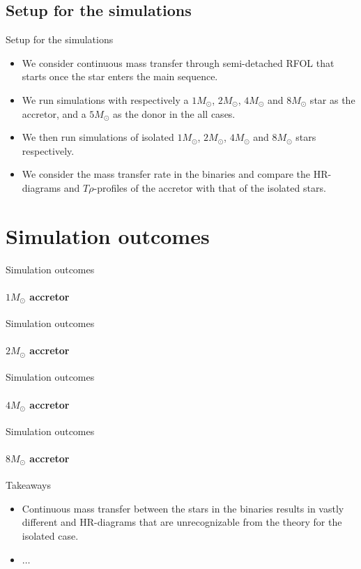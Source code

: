 \documentclass{beamer}
\begin{document}
\subsection{Setup for the simulations}
\begin{frame}{Setup for the simulations}
    \begin{itemize}
        \item<1-> We consider \alert{continuous mass transfer} through semi-detached RFOL that starts once the star enters the main sequence.
        \item<2-> We run simulations with respectively a $1M_\odot$, $2M_\odot$, $4M_\odot$ and $8M_\odot$ star as the \alert{accretor}, and a $5M_\odot$ as the \alert{donor} in the all cases.
        \item<3-> We then run simulations of \alert{isolated} $1M_\odot$, $2M_\odot$, $4M_\odot$ and $8M_\odot$ stars respectively.
        \item<4-> We consider the mass transfer rate in the binaries and compare the HR-diagrams and $T\rho$-profiles of the accretor with that of the isolated stars.
    \end{itemize}
\end{frame}

\section{Simulation outcomes}
\begin{frame}{Simulation outcomes}
\framesubtitle{$1M_\odot$ accretor}
\end{frame}
\begin{frame}{Simulation outcomes}
\framesubtitle{$2M_\odot$ accretor}
\end{frame}
\begin{frame}{Simulation outcomes}
\framesubtitle{$4M_\odot$ accretor}
\end{frame}
\begin{frame}{Simulation outcomes}
\framesubtitle{$8M_\odot$ accretor}
\end{frame}

\begin{frame}{Takeaways}
    \begin{itemize}
        \item Continuous mass transfer between the stars in the binaries results in vastly different and HR-diagrams that are unrecognizable from the theory for the isolated case.
        \item $\dots$
    \end{itemize}
\end{frame}
\end{document}
